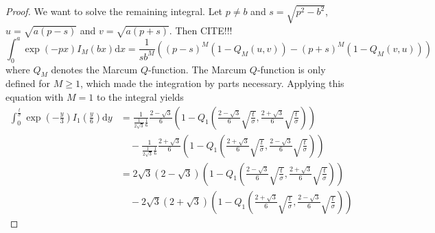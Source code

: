 \documentclass[a4paper,12pt]{article}
\theoremstyle{plain}
\theoremstyle{definition}
\theoremstyle{remark}
\begin{document}
\begin{proof}
	We want to solve the remaining integral. Let $p \neq b$ and $s = \sqrt{p^2 - b^2}$, $u = \sqrt{a (p - s)}$ and $v = \sqrt{a (p + s)}$. Then CITE!!!
	\begin{equation}\label{eqintmarcum}
		\int_0^a \exp(-p x) I_M ( b x ) \mathrm{d}x = \frac{1}{s b^M} \left( (p - s)^M ( 1 - Q_M(u, v) ) - (p + s)^M ( 1 - Q_M(v, u) ) \right)
	\end{equation}
	where $Q_M$ denotes the Marcum $Q$-function. The Marcum $Q$-function is only defined for $M \geq 1$, which made the integration by parts necessary. Applying this equation with $M = 1$ to the integral yields
	\begin{align*}
		\int_0^\frac{t}{\sigma} \exp \left( - \frac{y}{3} \right) I_1 \left( \frac{y}{6} \right) \mathrm{d}y &= \frac{1}{\frac{1}{2 \sqrt{3}} \frac{1}{6}} \frac{2 - \sqrt{3}}{6} \left( 1 - Q_1 \left( \frac{2 - \sqrt{3}}{6} \sqrt{\frac{t}{\sigma}}, \frac{2 + \sqrt{3}}{6} \sqrt{\frac{t}{\sigma}} \right) \right) \\
		&\quad - \frac{1}{\frac{1}{2 \sqrt{3}} \frac{1}{6}} \frac{2 + \sqrt{3}}{6} \left( 1 - Q_1 \left( \frac{2 + \sqrt{3}}{6} \sqrt{\frac{t}{\sigma}}, \frac{2 - \sqrt{3}}{6} \sqrt{\frac{t}{\sigma}} \right) \right) \\
		&= 2 \sqrt{3} (2 - \sqrt{3}) \left( 1 - Q_1 \left( \frac{2 - \sqrt{3}}{6} \sqrt{\frac{t}{\sigma}}, \frac{2 + \sqrt{3}}{6} \sqrt{\frac{t}{\sigma}} \right) \right) \\
		&\quad - 2 \sqrt{3} (2 + \sqrt{3}) \left( 1 - Q_1 \left( \frac{2 + \sqrt{3}}{6} \sqrt{\frac{t}{\sigma}}, \frac{2 - \sqrt{3}}{6} \sqrt{\frac{t}{\sigma}} \right) \right)
	\end{align*}
	

\end{proof}
\end{document}
